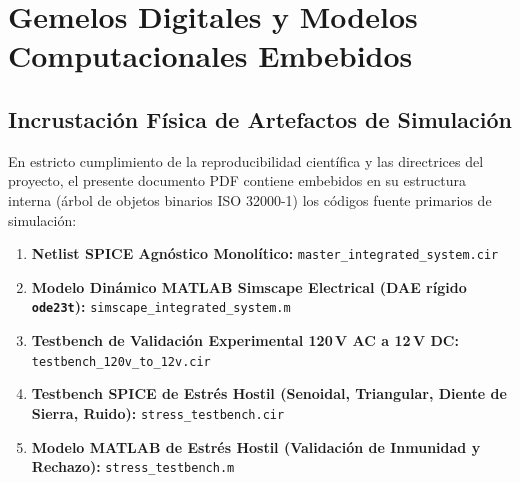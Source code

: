 
\chapter{Gemelos Digitales y Modelos Computacionales Embebidos}
\label{ch:appendices_digital_twins}

\section{Incrustación Física de Artefactos de Simulación}
En estricto cumplimiento de la reproducibilidad científica y las directrices del proyecto, el presente documento PDF contiene embebidos en su estructura interna (árbol de objetos binarios ISO 32000-1) los códigos fuente primarios de simulación:

\begin{enumerate}
    \item \textbf{Netlist SPICE Agnóstico Monolítico:} \texttt{master\_integrated\_system.cir}
    \item \textbf{Modelo Dinámico MATLAB Simscape Electrical (DAE rígido \texttt{ode23t}):} \texttt{simscape\_integrated\_system.m}
    \item \textbf{Testbench de Validación Experimental 120\,V AC a 12\,V DC:} \texttt{testbench\_120v\allowbreak\_to\allowbreak\_12v.cir}
    \item \textbf{Testbench SPICE de Estrés Hostil (Senoidal, Triangular, Diente de Sierra, Ruido):} \texttt{stress\_testbench.cir}
    \item \textbf{Modelo MATLAB de Estrés Hostil (Validación de Inmunidad y Rechazo):} \texttt{stress\_testbench.m}
\end{enumerate}



